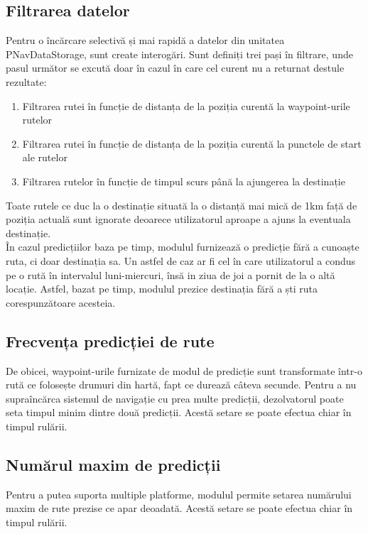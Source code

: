 	\subsection{Filtrarea datelor}
	Pentru o încărcare selectivă și mai rapidă a datelor din unitatea PNavDataStorage, sunt create interogări. Sunt definiți trei pași în filtrare, unde pasul următor se excută doar în cazul în care cel curent nu a returnat destule rezultate:
		\begin{enumerate}
				 \setlength\itemsep{0em}
					\item Filtrarea rutei în funcție de distanța de la poziția curentă la waypoint-urile rutelor
					\item Filtrarea rutei în funcție de distanța de la poziția curentă la punctele de start ale rutelor
					\item Filtrarea rutelor în funcție de timpul scurs până la ajungerea la destinație
		\end{enumerate}

	Toate rutele ce duc la o destinație situată la o distanță mai mică de 1km față de poziția actuală sunt ignorate deoarece utilizatorul aproape a ajuns la eventuala destinație.
	\vspace{6pt}
	\\În cazul predicțiilor baza pe timp, modulul furnizează o predicție fără a cunoaște ruta, ci doar destinația sa. Un astfel de caz ar fi cel în care utilizatorul a condus pe o rută în intervalul luni-miercuri, însă in ziua de joi a pornit de la o altă locație. Astfel, bazat pe timp, modulul prezice destinația fără a ști ruta corespunzătoare acesteia.
	
	
		\subsection{Frecvența predicției de rute}
		De obicei, waypoint-urile furnizate de modul de predicție sunt transformate într-o rută ce folosește drumuri din hartă, fapt ce durează câteva secunde.
		Pentru a nu supraîncărca sistemul de navigație cu prea multe predicții, dezolvatorul poate seta timpul minim dintre două predicții. Acestă setare se poate efectua chiar în timpul rulării.
		
		\subsection{Numărul maxim de predicții}
		Pentru a putea suporta multiple platforme, modulul permite setarea numărului maxim de rute prezise ce apar deoadată. Acestă setare se poate efectua chiar în timpul rulării.
		
